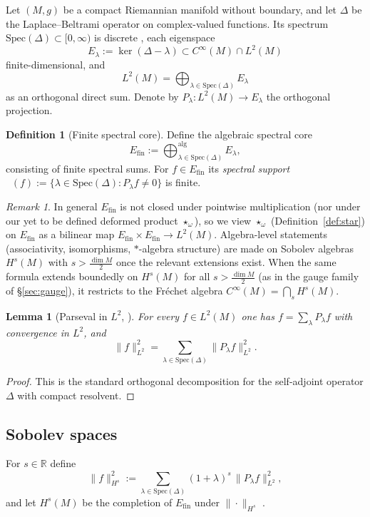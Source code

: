 \documentclass[11pt]{amsart}
\theoremstyle{plain}
\newtheorem{lemma}[theorem]{Lemma}
\theoremstyle{definition}
\newtheorem{definition}[theorem]{Definition}
\theoremstyle{remark}
\newtheorem{remark}[theorem]{Remark}
\newcommand{\Spec}{\mathrm{Spec}}
\newcommand{\bbR}{\mathbb{R}}
\DeclareMathOperator{\suppspec}{supp_{\Delta}}
\begin{document}
Let $(M,g)$ be a compact Riemannian manifold without boundary, and let $\Delta$ be the Laplace--Beltrami operator on complex-valued functions.
Its spectrum $\Spec(\Delta)\subset[0,\infty)$ is discrete \cite{Chavel1984}, each eigenspace
\[ E_\lambda:=\ker(\Delta-\lambda)\subset C^\infty(M)\cap L^2(M) \]
finite-dimensional, and
\begin{equation}\label{eq:L2-decomp}
L^2(M)=\bigoplus_{\lambda\in\Spec(\Delta)} E_\lambda
\end{equation}
as an orthogonal direct sum. Denote by $P_\lambda:L^2(M)\to E_\lambda$ the orthogonal projection.

\begin{definition}[Finite spectral core]
Define the algebraic spectral core
\[ E_{\mathrm{fin}}:=\bigoplus_{\lambda\in\Spec(\Delta)}^{\mathrm{alg}} E_\lambda, \]
consisting of finite spectral sums. For $f\in E_{\mathrm{fin}}$ its \emph{spectral support}
$\suppspec(f):=\{\lambda\in\Spec(\Delta):P_\lambda f\neq 0\}$ is finite.
\end{definition}

\begin{remark}\label{rem:Efin-not-algebra}
In general $E_{\mathrm{fin}}$ is not closed under pointwise multiplication (nor under our yet to be defined deformed product $\star_\omega$),
so we view $\star_\omega$ (Definition~\ref{def:star}) on $E_{\mathrm{fin}}$ as a bilinear map $E_{\mathrm{fin}}\times E_{\mathrm{fin}}\to L^2(M)$.
Algebra-level statements (associativity, isomorphisms, $*$-algebra structure) are made on Sobolev algebras $H^s(M)$ with
$s>\frac{\dim M}{2}$ once the relevant extensions exist. When the same formula extends boundedly on $H^s(M)$ for all $s>\frac{\dim M}{2}$
(as in the gauge family of \S\ref{sec:gauge}), it restricts to the Fr\'echet algebra $C^\infty(M)=\bigcap_s H^s(M)$.
\end{remark}

\begin{lemma}[Parseval in $L^2$, \cite{Chavel1984}]\label{lem:parseval-L2}
For every $f\in L^2(M)$ one has $f=\sum_{\lambda}P_\lambda f$ with convergence in $L^2$, and
\[ \|f\|_{L^2}^2=\sum_{\lambda\in\Spec(\Delta)}\|P_\lambda f\|_{L^2}^2. \]
\end{lemma}

\begin{proof}
This is the standard orthogonal decomposition for the self-adjoint operator $\Delta$ with compact resolvent.
\end{proof}

\subsection*{Sobolev spaces}
For $s\in\bbR$ define
\[ \|f\|_{H^s}^2:=\sum_{\lambda\in\Spec(\Delta)} (1+\lambda)^s\,\|P_\lambda f\|_{L^2}^2, \]
and let $H^s(M)$ be the completion of $E_{\mathrm{fin}}$ under $\|\cdot\|_{H^s}$ \cite{Hebey1996}.
\end{document}
